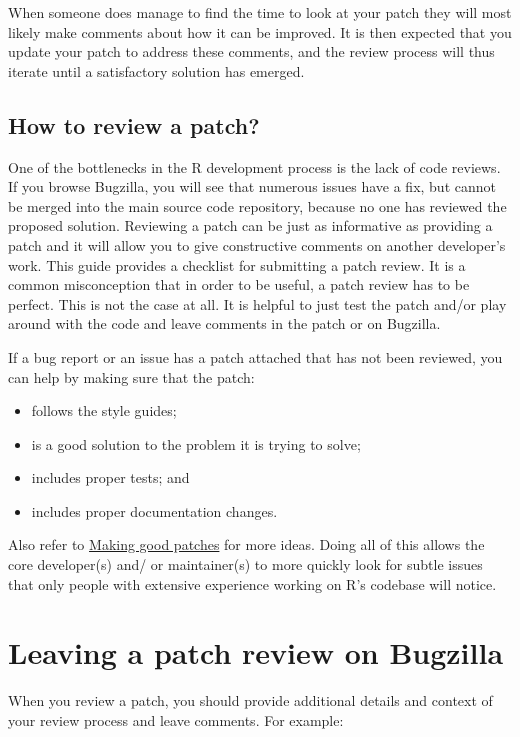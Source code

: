 \documentclass[
]{book}
\begin{document}
When someone does manage to find the time to look at your patch they will most likely make comments about how it can be improved. It is then expected that you update your patch to address these comments, and the review process will thus iterate until a satisfactory solution has emerged.

\subsection{How to review a patch?}\label{how-to-review-a-patch}

One of the bottlenecks in the R development process is the lack of code reviews. If you browse Bugzilla, you will see that numerous issues have a fix, but cannot be merged into the main source code repository, because no one has reviewed the proposed solution. Reviewing a patch can be just as informative as providing a patch and it will allow you to give constructive comments on another developer's work. This guide provides a checklist for submitting a patch review. It is a common misconception that in order to be useful, a patch review has to be perfect. This is not the case at all. It is helpful to just test the patch and/or play around with the code and leave comments in the patch or on Bugzilla.

If a bug report or an issue has a patch attached that has not been reviewed, you can help by making sure that the patch:

\begin{itemize}
\item
  follows the style guides;
\item
  is a good solution to the problem it is trying to solve;
\item
  includes proper tests; and
\item
  includes proper documentation changes.
\end{itemize}

Also refer to \hyperref[GoodPatches]{Making good patches} for more ideas. Doing all of this allows the core developer(s) and/ or maintainer(s) to more quickly look for subtle issues that only people with extensive experience working on R's codebase will notice.

\section{Leaving a patch review on Bugzilla}\label{leaving-a-patch-review-on-bugzilla}

When you review a patch, you should provide additional details and context of your review process and leave comments. For example:
\end{document}
